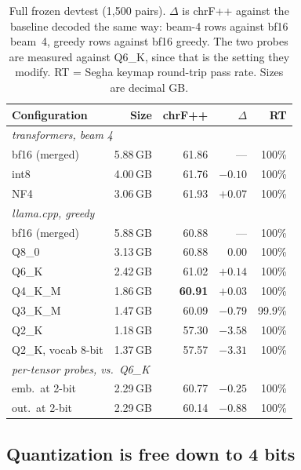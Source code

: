 \documentclass[10pt,twocolumn]{article}
\newcommand{\bfBeamChrf}{61.86}
\newcommand{\bfGreedyChrf}{60.88}
\newcommand{\fullQeight}{60.88}\newcommand{\fullQeightD}{$0.00$}
\newcommand{\fullQfour}{\textbf{60.91}}\newcommand{\fullQfourD}{$+0.03$}
\newcommand{\fullQthree}{60.09}\newcommand{\fullQthreeD}{$-0.79$}
\newcommand{\fullQtwo}{57.30}\newcommand{\fullQtwoD}{$-3.58$}
\newcommand{\fullQtwoEmb}{57.57}\newcommand{\fullQtwoEmbD}{$-3.31$}
\newcommand{\fullQsix}{61.02}\newcommand{\fullQsixD}{$+0.14$}
\newcommand{\fullEmbTwo}{60.77}\newcommand{\fullEmbTwoD}{$-0.25$}
\newcommand{\fullOutTwo}{60.14}\newcommand{\fullOutTwoD}{$-0.88$}
\begin{document}
\begin{table}[t]
\centering\small
\setlength{\tabcolsep}{4pt}
\begin{tabular}{lrrrr}
\toprule
Configuration & Size & chrF++ & $\Delta$ & RT \\
\midrule
\multicolumn{5}{l}{\emph{transformers, beam 4}}\\
bf16 (merged)     & 5.88\,GB & \bfBeamChrf{} & --- & 100\% \\
int8              & 4.00\,GB & 61.76 & $-0.10$ & 100\% \\
NF4               & 3.06\,GB & 61.93 & $+0.07$ & 100\% \\
\midrule
\multicolumn{5}{l}{\emph{llama.cpp, greedy}}\\
bf16 (merged)     & 5.88\,GB & \bfGreedyChrf{} & --- & 100\% \\
Q8\_0             & 3.13\,GB & \fullQeight{} & \fullQeightD{} & 100\% \\
Q6\_K             & 2.42\,GB & \fullQsix{} & \fullQsixD{} & 100\% \\
Q4\_K\_M          & 1.86\,GB & \fullQfour{} & \fullQfourD{} & 100\% \\
Q3\_K\_M          & 1.47\,GB & \fullQthree{} & \fullQthreeD{} & 99.9\% \\
Q2\_K             & 1.18\,GB & \fullQtwo{} & \fullQtwoD{} & 100\% \\
Q2\_K, vocab 8-bit & 1.37\,GB & \fullQtwoEmb{} & \fullQtwoEmbD{} & 100\% \\
\midrule
\multicolumn{5}{l}{\emph{per-tensor probes, vs.\ Q6\_K}}\\
emb.\ at 2-bit    & 2.29\,GB & \fullEmbTwo{} & \fullEmbTwoD{} & 100\% \\
out.\ at 2-bit    & 2.29\,GB & \fullOutTwo{} & \fullOutTwoD{} & 100\% \\
\bottomrule
\end{tabular}
\caption{Full frozen devtest (1{,}500 pairs). $\Delta$ is chrF++ against
the baseline decoded the same way: beam-4 rows against bf16 beam~4,
greedy rows against bf16 greedy. The two probes are measured against
Q6\_K, since that is the setting they modify. RT = Segha keymap
round-trip pass rate. Sizes are decimal GB.}
\label{tab:full}
\end{table}

\subsection{Quantization is free down to 4 bits}
\end{document}
